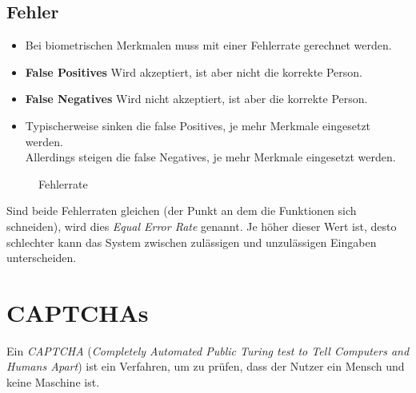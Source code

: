 \documentclass[a4paper, 11pt, accentcolor = tud3b]{tudreport}
\begin{document}
            \subsection{Fehler}
                \begin{itemize}
                	\item Bei biometrischen Merkmalen muss mit einer Fehlerrate gerechnet werden.
                	\item \textbf{False Positives} \tabto{2cm} Wird akzeptiert, ist aber nicht die korrekte Person.
                	\item \textbf{False Negatives} \tabto{2cm} Wird nicht akzeptiert, ist aber die korrekte Person.
                	\item Typischerweise sinken die false Positives, je mehr Merkmale eingesetzt werden. \\ Allerdings steigen die false Negatives, je mehr Merkmale eingesetzt werden.
                \end{itemize}
	            \begin{figure}[H]
	            	\centering
{}
	            	\caption{Fehlerrate}
	            \end{figure}
	            Sind beide Fehlerraten gleichen (der Punkt an dem die Funktionen sich schneiden), wird dies \textit{Equal Error Rate} genannt. Je höher dieser Wert ist, desto schlechter kann das System zwischen zulässigen und unzulässigen Eingaben unterscheiden.

        \section{CAPTCHAs}
            Ein \textit{CAPTCHA} (\textit{Completely Automated Public Turing test to Tell Computers and Humans Apart}) ist ein Verfahren, um zu prüfen, dass der Nutzer ein Mensch und keine Maschine ist.
            
\end{document}

